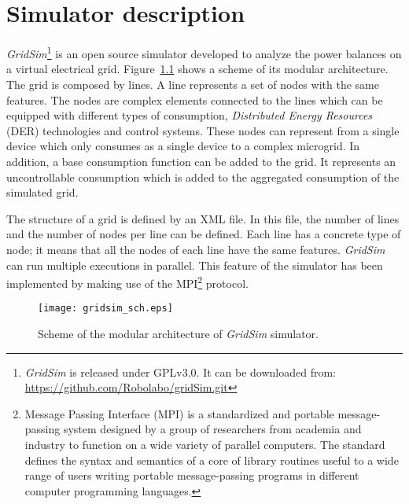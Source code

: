 \chapter{Simulator description}
\label{chap:description}

{\it GridSim}\footnote{
{\it GridSim} is released under GPLv3.0.
It can be downloaded from: \href{https://github.com/Robolabo/gridSim.git}{https://github.com/Robolabo/gridSim.git} 
} is an open source simulator developed to analyze the power balances on a virtual electrical grid.
Figure~\ref{fig:gridsim_sch} shows a scheme of its modular architecture.
The grid is composed by lines.
A line represents a set of nodes with the same features.
The nodes are complex elements connected to the lines which can be equipped with different types of consumption, {\it Distributed Energy Resources} (DER) technologies and control systems.
These nodes can represent from a single device which only consumes as a single device to a complex microgrid.
In addition, a base consumption function can be added to the grid.
It represents an uncontrollable consumption which is added to the aggregated consumption of the simulated grid.

The structure of a grid is defined by an XML file.
In this file, the number of lines and the number of nodes per line can be defined.
Each line has a concrete type of node; 
it means that all the nodes of each line have the same features.
{\it GridSim} can run multiple executions in parallel.
This feature of the simulator has been implemented by making use of the MPI\footnote{
Message Passing Interface (MPI) is a standardized and portable message-passing system designed by a group of researchers from academia and industry to function on a wide variety of parallel computers.
The standard defines the syntax and semantics of a core of library routines useful to a wide range of users writing portable message-passing programs in different computer programming languages.
} protocol.
\begin{figure}[!t]	
	\begin{center}
		\texttt{[image: gridsim\_sch.eps]} \\ 
		\caption[Scheme of the modular architecture of {\it GridSim} simulator.]
		{Scheme of the modular architecture of {\it GridSim} simulator.}		
		\label{fig:gridsim_sch}	
	\end{center}
\end{figure}

